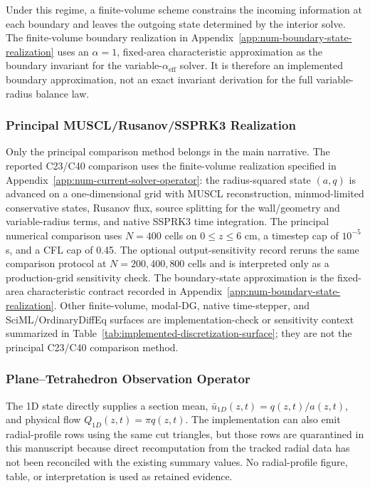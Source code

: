 Under this regime, a finite-volume scheme constrains the incoming information at
each boundary and leaves the outgoing state determined by the interior solve.
The finite-volume boundary realization in
Appendix~\ref{app:num-boundary-state-realization} uses an $\alpha=1$,
fixed-area characteristic approximation as the boundary invariant for the
variable-$\alpha_{\mathrm{eff}}$ solver. It is therefore an implemented boundary
approximation, not an exact invariant derivation for the full variable-radius
balance law.

\subsubsection{Principal MUSCL/Rusanov/SSPRK3 Realization}
\label{subsec:muscl-ssprk3-discretization}

Only the principal comparison method belongs in the main narrative. The reported
C23/C40 comparison uses the finite-volume realization specified in
Appendix~\ref{app:num-current-solver-operator}: the radius-squared state
$(a,q)$ is advanced on a one-dimensional grid with MUSCL reconstruction,
minmod-limited conservative states, Rusanov flux, source splitting for the
wall/geometry and variable-radius terms, and native SSPRK3 time integration.
The principal numerical comparison uses $N=400$ cells on $0\le z\le6$ cm, a
timestep cap of $10^{-5}$ s, and a CFL cap of 0.45. The optional
output-sensitivity record reruns the same comparison protocol at
$N=200,400,800$ cells and is interpreted only as a production-grid sensitivity
check. The boundary-state approximation is the fixed-area characteristic
contract recorded in
Appendix~\ref{app:num-boundary-state-realization}. Other finite-volume, modal-DG,
native time-stepper, and SciML/OrdinaryDiffEq surfaces are implementation-check
or sensitivity context summarized in Table~\ref{tab:implemented-discretization-surface};
they are not the principal C23/C40 comparison method.

\subsubsection{Plane--Tetrahedron Observation Operator}
\label{subsec:cross-sectional-velocity-reconstruction}
\label{subsec:plane-tetrahedron-comparison-operator}

The 1D state directly supplies a section mean,
$\bar u_{1D}(z,t)=q(z,t)/a(z,t)$, and physical flow
$Q_{1D}(z,t)=\pi q(z,t)$. The implementation can also emit radial-profile
rows using the same cut triangles, but those rows are quarantined in this
manuscript because direct recomputation from the tracked radial data has not
been reconciled with the existing summary values. No radial-profile figure,
table, or interpretation is used as retained evidence.


